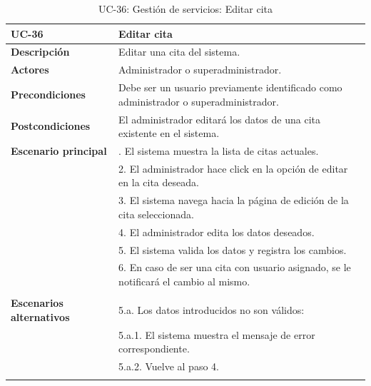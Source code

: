\begin{table}
  \begin{center}
    \begin{tabularx}{16.4cm}{|l|X|}
      \hline
      \textbf{UC-36} & \textbf{Editar cita}\\
      \hline
      \textbf{Descripción} & Editar una cita del sistema.\\
      \hline
      \textbf{Actores} & Administrador o superadministrador.\\
      \hline
      \textbf{Precondiciones} & Debe ser un usuario previamente identificado como administrador o superadministrador.\\
      \hline
      \textbf{Postcondiciones} & El administrador editará los datos de una cita existente en el sistema.\\
      \hline
      \textbf{Escenario principal} & \smallskip 1. El sistema muestra la lista de citas actuales.\\
      & 2. El administrador hace click en la opción de editar en la cita deseada.\\
      & 3. El sistema navega hacia la página de edición de la cita seleccionada.\\
      & 4. El administrador edita los datos deseados.\\
      & 5. El sistema valida los datos y registra los cambios.\\
      & 6. En caso de ser una cita con usuario asignado, se le notificará el cambio al mismo.\\
      & \\
      \hline
      \textbf{Escenarios alternativos} & \smallskip 5.a. Los datos introducidos no son válidos:\\
      & \hspace{0.3cm} 5.a.1. El sistema muestra el mensaje de error correspondiente.\\
      & \hspace{0.3cm} 5.a.2. Vuelve al paso 4.\\
      & \\
      \hline
    \end{tabularx}
    \caption{UC-36: Gestión de servicios: Editar cita}
    \label{tab:CU-editar-cita}
  \end{center}
\end{table}


